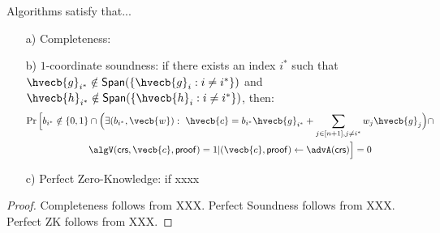 \begin{theorem} Algorithms satisfy that...   
\begin{itemize}
 \item[a)] Completeness:
\item[b)] $1$-coordinate soundness: if there exists an index $i^*$ such that $\hvecb{g}_{i^*} \notin \mathsf{Span}(\{\hvecb{g}_{i} : i \neq i^*\})$ and $\hvecb{h}_{i^*} \notin \mathsf{Span}(\{\hvecb{h}_{i} : i \neq i^*\})$, then:
\begin{multline*}
\Pr\Big[ b_{i^*} \notin \{0,1\} \cap \Big(\exists (b_{i^*}, \vecb{w}): \ \hvecb{c}= b_{i^*} \hvecb{g}_{i^*} + \sum_{j \in [n+1], j\neq i^*} w_{j} \hvecb{g}_{j}  \Big)  \cap  \\ \algV(
\mathsf{crs},\vecb{c},\mathsf{proof})=1 | (\vecb{c},\mathsf{proof}) \gets \advA(\mathsf{crs})     \Big]=0$$
\end{multline*}
\item[c)] Perfect Zero-Knowledge: if xxxx 
\end{itemize}
\end{theorem}	
\begin{proof}
Completeness follows from XXX. Perfect Soundness follows from XXX. Perfect ZK follows from XXX.
\end{proof}
